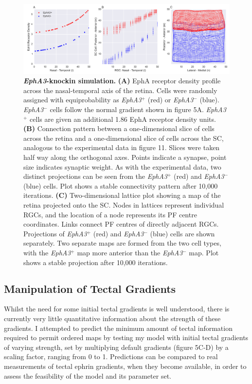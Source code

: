 \documentclass[11pt]{"article"}
\begin{document}
\begin{figure}[!h]
\includegraphics[scale=0.57]{EphA3}
\caption{\textbf{\textit{EphA3}-knockin simulation.}
\textbf{(A)} EphA receptor density profile across the nasal-temporal axis of the retina. Cells were randomly assigned with equiprobability as \textit{EphA3}$^+$ (red) or \textit{EphA3}$^-$ (blue). \textit{EphA3}$^-$ cells follow the normal gradient shown in figure 5A. \textit{EphA3}$^+$ cells are given an additional 1.86 EphA receptor density units. 
\textbf{(B)} Connection pattern between a one-dimensional slice of cells across the retina and a one-dimensional slice of cells across the SC, analogous to the experimental data in figure 11. Slices were taken half way along the orthogonal axes. Points indicate a synapse, point size indicates synaptic weight. As with the experimental data, two distinct projections can be seen from the \textit{EphA3}$^+$ (red) and \textit{EphA3}$^-$ (blue) cells.
Plot shows a stable connectivity pattern after 10,000 iterations.
\textbf{(C)} Two-dimensional lattice plot showing a map of the retina projected onto the SC. Nodes in lattices represent individual RGCs, and the location of a node represents its PF centre coordinates. Links connect PF centres of directly adjacent RGCs. Projections of \textit{EphA3}$^+$ (red) and \textit{EphA3}$^-$ (blue) cells are shown separately. Two separate maps are formed from the two cell types, with the \textit{EphA3}$^+$ map more anterior than the \textit{EphA3}$^-$ map. Plot shows a stable projection after 10,000 iterations.}
\end{figure}
\pagebreak

\subsection{Manipulation of Tectal Gradients}


Whilst the need for some initial tectal gradients is well understood, there is currently very little quantitative information about the strength of these gradients. I attempted to predict the minimum amount of tectal information required to permit ordered maps by testing my model with initial tectal gradients of varying strength, set by multiplying default gradients (figure 5C-D) by a scaling factor, ranging from 0 to 1. Predictions can be compared to real measurements of tectal ephrin gradients, when they become available, in order to assess the feasibility of the model and its parameter set.
\\
\end{document}
